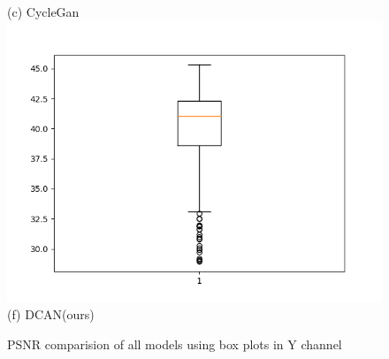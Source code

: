 \documentclass[conference]{IEEEtran}
\begin{document}
\begin{figure}[h!]
\begin{minipage}{0.3\textwidth}
  (c) CycleGan 
  \includegraphics[width=\textwidth,height=0.2\textheight]{proposed_y (2).png}
  (f) DCAN(ours)
  \end{minipage}%
  \caption{PSNR comparision of all models using box plots in Y channel}
  \label{PSNR:Y}
  \end{figure}
\end{document}
